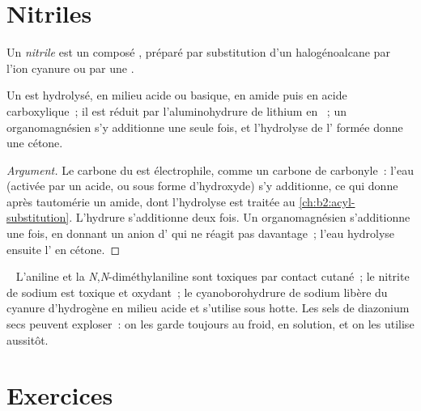 \section{Nitriles}

\begin{definition}[Nitrile]\label{def:b2:amines:nitrile}
Un \emph{nitrile} est un composé , préparé par substitution d'un
halogénoalcane par l'ion cyanure ou par une .
\end{definition}

\begin{proposition}\label{prop:b2:amines:nitrile}
Un  est hydrolysé, en milieu acide ou basique, en amide puis en acide carboxylique~; il est
réduit par l'aluminohydrure de lithium en  ~; un organomagnésien s'y
additionne une seule fois, et l'hydrolyse de l' formée donne une cétone.
\end{proposition}

\begin{proof}[Argument]
Le carbone du  est électrophile, comme un carbone de carbonyle~: l'eau (activée par un
acide, ou sous forme d'hydroxyde) s'y additionne, ce qui donne après tautomérie un amide, dont
l'hydrolyse est traitée au \cref{ch:b2:acyl-substitution}. L'hydrure s'additionne deux fois. Un
organomagnésien s'additionne une fois, en donnant un anion d' qui ne réagit pas davantage~;
l'eau hydrolyse ensuite l' en cétone.
\end{proof}

\begin{safety}{\,\,\,}
L'aniline et la \textit{N},\textit{N}-diméthylaniline sont toxiques par contact cutané~; le
nitrite de sodium est toxique et oxydant~; le cyanoborohydrure de sodium libère du cyanure
d'hydrogène en milieu acide et s'utilise sous hotte. Les sels de diazonium secs peuvent exploser~:
on les garde toujours au froid, en solution, et on les utilise aussitôt.
\end{safety}

\section{Exercices}

